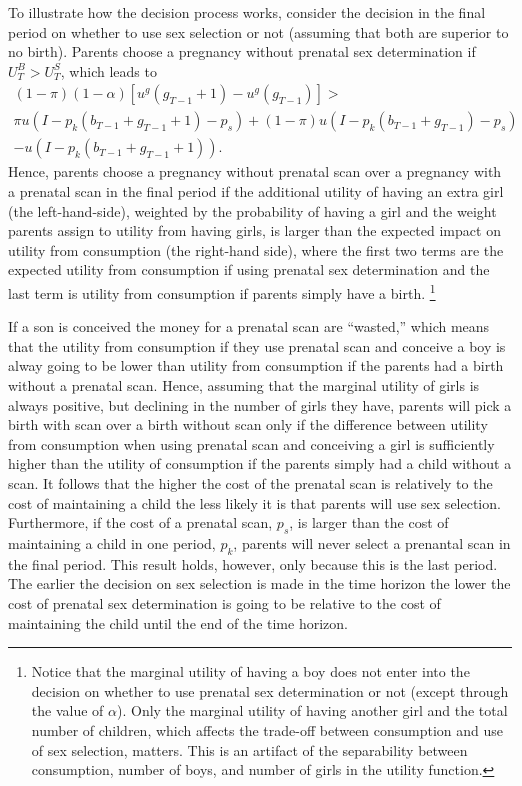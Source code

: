 \documentclass[12pt,letterpaper]{article}
\begin{document}
To illustrate how the decision process works, consider
the decision in the final period on whether to use sex selection or not
(assuming that both are superior to no birth).
Parents choose a pregnancy without prenatal sex determination
if $U_T^B > U_T^S$, which leads to
\begin{multline} \label{eq:last_simple}
(1-\pi)(1-\alpha) [ u^g(g_{T-1}+1) - u^g(g_{T-1}) ]
> \\
\pi u(I - p_k(b_{T-1} + g_{T-1} + 1) - p_s) 
+ (1-\pi) u(I - p_k(b_{T-1} + g_{T-1}) - p_s) \\
- u(I - p_k(b_{T-1} + g_{T-1}+1)).
\end{multline}
Hence, parents choose a pregnancy without prenatal scan over
a pregnancy with a prenatal scan in the final period if
the additional utility of having an extra girl (the left-hand-side),
weighted by the probability of having a girl and the weight parents
assign to utility from having girls, is larger than the expected impact on
utility from consumption (the right-hand side), where
the first two terms are the expected utility from consumption if 
using prenatal sex determination and the last term is utility from
consumption if parents simply have a birth.%
\footnote{
Notice that the marginal utility of having a boy does not enter
into the decision on whether to use prenatal sex determination or not
(except through the value of $\alpha$).
Only the marginal utility of having another girl
and the total number of children, which affects the trade-off between
consumption and use of sex selection, matters.
This is an artifact of the separability between consumption, number of
boys, and number of girls in the utility function.
}

If a son is conceived the money for a prenatal scan are ``wasted,''
which means that the utility from consumption if they use prenatal scan
and conceive a boy is alway going to be lower than utility from consumption 
if the parents had a birth without a prenatal scan.
Hence, assuming that the marginal utility of girls is always positive,
but declining in the number of girls they have, parents will pick
a birth with scan over a birth without scan only if the difference between
utility from consumption when using prenatal scan and conceiving a girl
is sufficiently higher than the utility of consumption if the parents
simply had a child without a scan.
It follows that the higher the cost of the prenatal scan is relatively
to the cost of maintaining a child the less likely it is that parents will 
use sex selection.
Furthermore, if the cost of a prenatal scan, 
$p_s$, is larger than the cost of maintaining a child in one period, $p_k$, 
parents will never select a prenantal scan in the final period.
This result holds, however, only because this is the last period. 
The earlier the decision on sex selection is made in the time horizon
the lower the cost of prenatal sex determination is going to be 
relative to the cost of maintaining the child until the end of the time
horizon.
\end{document}
